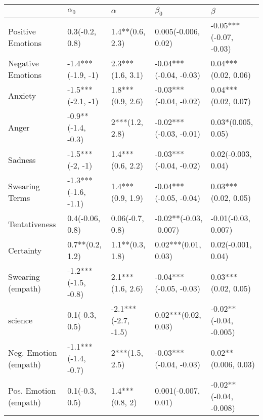 \begin{tabular}{lllll}
\toprule
{} &           $\alpha_0$ &             $\alpha$ &               $\beta_0$ &                 $\beta$ \\
\midrule
Positive Emotions     &       0.3(-0.2, 0.8) &      1.4**(0.6, 2.3) &     0.005(-0.006, 0.02) &  -0.05***(-0.07, -0.03) \\
Negative Emotions     &    -1.4***(-1.9, -1) &     2.3***(1.6, 3.1) &  -0.04***(-0.04, -0.03) &     0.04***(0.02, 0.06) \\
Anxiety               &    -1.5***(-2.1, -1) &     1.8***(0.9, 2.6) &  -0.03***(-0.04, -0.02) &     0.04***(0.02, 0.07) \\
Anger                 &   -0.9**(-1.4, -0.3) &       2***(1.2, 2.8) &  -0.02***(-0.03, -0.01) &      0.03*(0.005, 0.05) \\
Sadness               &      -1.5***(-2, -1) &     1.4***(0.6, 2.2) &  -0.03***(-0.04, -0.02) &      0.02(-0.003, 0.04) \\
Swearing Terms        &  -1.3***(-1.6, -1.1) &     1.4***(0.9, 1.9) &  -0.04***(-0.05, -0.04) &     0.03***(0.02, 0.05) \\
Tentativeness         &      0.4(-0.06, 0.8) &      0.06(-0.7, 0.8) &  -0.02**(-0.03, -0.007) &     -0.01(-0.03, 0.007) \\
Certainty             &      0.7**(0.2, 1.2) &      1.1**(0.3, 1.8) &     0.02***(0.01, 0.03) &      0.02(-0.001, 0.04) \\
Swearing (empath)     &  -1.2***(-1.5, -0.8) &     2.1***(1.6, 2.6) &  -0.04***(-0.05, -0.03) &     0.03***(0.02, 0.05) \\
science               &       0.1(-0.3, 0.5) &  -2.1***(-2.7, -1.5) &     0.02***(0.02, 0.03) &  -0.02**(-0.04, -0.005) \\
Neg. Emotion (empath) &  -1.1***(-1.4, -0.7) &       2***(1.5, 2.5) &  -0.03***(-0.04, -0.03) &     0.02**(0.006, 0.03) \\
Pos. Emotion (empath) &       0.1(-0.3, 0.5) &       1.4***(0.8, 2) &     0.001(-0.007, 0.01) &  -0.02**(-0.04, -0.008) \\
\bottomrule
\end{tabular}
